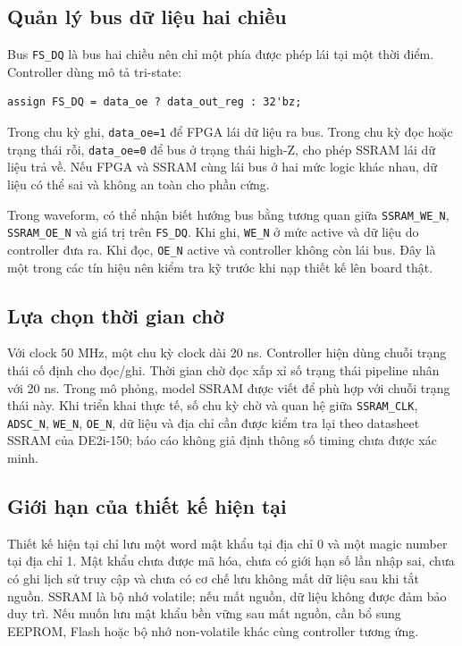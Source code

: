 \documentclass[13pt,a4paper]{article}
\begin{document}
\subsection{Quản lý bus dữ liệu hai chiều}
Bus \texttt{FS\_DQ} là bus hai chiều nên chỉ một phía được phép lái tại một thời điểm. Controller dùng mô tả tri-state:
\begin{lstlisting}[style=verilogstyle]
assign FS_DQ = data_oe ? data_out_reg : 32'bz;
\end{lstlisting}
Trong chu kỳ ghi, \texttt{data\_oe=1} để FPGA lái dữ liệu ra bus. Trong chu kỳ đọc hoặc trạng thái rỗi, \texttt{data\_oe=0} để bus ở trạng thái high-Z, cho phép SSRAM lái dữ liệu trả về. Nếu FPGA và SSRAM cùng lái bus ở hai mức logic khác nhau, dữ liệu có thể sai và không an toàn cho phần cứng.

Trong waveform, có thể nhận biết hướng bus bằng tương quan giữa \texttt{SSRAM\_WE\_N}, \texttt{SSRAM\_OE\_N} và giá trị trên \texttt{FS\_DQ}. Khi ghi, \texttt{WE\_N} ở mức active và dữ liệu do controller đưa ra. Khi đọc, \texttt{OE\_N} active và controller không còn lái bus. Đây là một trong các tín hiệu nên kiểm tra kỹ trước khi nạp thiết kế lên board thật.

\subsection{Lựa chọn thời gian chờ}
Với clock 50 MHz, một chu kỳ clock dài 20 ns. Controller hiện dùng chuỗi trạng thái cố định cho đọc/ghi. Thời gian chờ đọc xấp xỉ số trạng thái pipeline nhân với 20 ns. Trong mô phỏng, model SSRAM được viết để phù hợp với chuỗi trạng thái này. Khi triển khai thực tế, số chu kỳ chờ và quan hệ giữa \texttt{SSRAM\_CLK}, \texttt{ADSC\_N}, \texttt{WE\_N}, \texttt{OE\_N}, dữ liệu và địa chỉ cần được kiểm tra lại theo datasheet SSRAM của DE2i-150; báo cáo không giả định thông số timing chưa được xác minh.

\subsection{Giới hạn của thiết kế hiện tại}
Thiết kế hiện tại chỉ lưu một word mật khẩu tại địa chỉ 0 và một magic number tại địa chỉ 1. Mật khẩu chưa được mã hóa, chưa có giới hạn số lần nhập sai, chưa có ghi lịch sử truy cập và chưa có cơ chế lưu không mất dữ liệu sau khi tắt nguồn. SSRAM là bộ nhớ volatile; nếu mất nguồn, dữ liệu không được đảm bảo duy trì. Nếu muốn lưu mật khẩu bền vững sau mất nguồn, cần bổ sung EEPROM, Flash hoặc bộ nhớ non-volatile khác cùng controller tương ứng.
\end{document}
